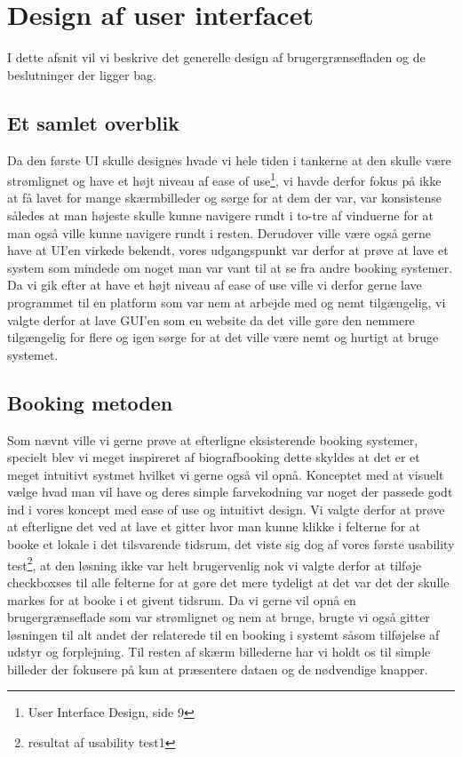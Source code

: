 \section{Design af user interfacet}
I dette afsnit vil vi beskrive det generelle design af brugergrænsefladen og de beslutninger der ligger bag.

\subsection{Et samlet overblik}
Da den første UI skulle designes hvade vi hele tiden i tankerne at den skulle være strømlignet og have et højt niveau af ease of use\footnote{User Interface Design, side 9}, vi havde derfor fokus på ikke at få lavet for mange skærmbilleder og sørge for at dem der var, var konsistense således at man højeste skulle kunne navigere rundt i to-tre af vinduerne for at man også ville kunne navigere rundt i resten. Derudover ville være også gerne have at UI'en virkede bekendt, vores udgangspunkt var derfor at prøve at lave et system som mindede om noget man var vant  til at se fra andre booking systemer.
Da vi gik efter at have et højt niveau af ease of use ville vi derfor gerne lave programmet til en platform som var nem at arbejde med og nemt tilgængelig, vi valgte derfor at lave GUI'en som en website  da det ville gøre den nemmere tilgængelig for flere og igen sørge for at det ville være nemt og hurtigt at bruge systemet.

\subsection{Booking metoden}
Som nævnt ville vi gerne prøve at efterligne eksisterende booking systemer, specielt blev vi meget inspireret af biografbooking dette skyldes at det er et meget intuitivt systmet hvilket vi gerne også vil opnå. Konceptet med at visuelt vælge hvad man vil have og deres simple farvekodning var noget der passede godt ind i vores koncept med ease of use og intuitivt design.
Vi valgte derfor at prøve at efterligne det ved at lave et gitter hvor man kunne klikke i felterne for at booke et lokale i det tilsvarende tidsrum, det viste sig dog af vores første usability test\footnote{resultat af usability test1}, at den løsning ikke var helt brugervenlig nok vi valgte derfor at tilføje checkboxses til alle felterne for at gøre det mere tydeligt at det var det der skulle markes for at booke i et givent tidsrum.
Da vi gerne vil opnå en brugergrænseflade som var strømlignet og nem at bruge, brugte vi også gitter løsningen til alt andet der relaterede til en booking i systemt såsom tilføjelse af  udstyr og forplejning. Til resten af skærm billederne har vi holdt os til simple billeder der fokusere på kun at præsentere dataen og de nødvendige knapper.


